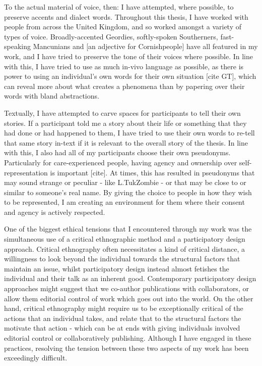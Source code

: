 To the actual material of voice, then: I have attempted, where possible, to preserve accents and dialect words. Throughout this thesis, I have worked with people from across the United Kingdom, and so worked amongst a variety of types of voice. Broadly-accented Geordies, softly-spoken Southerners, fast-speaking Mancunians and [an adjective for Cornishpeople] have all featured in my work, and I have tried to preserve the tone of their voices where possible. In line with this, I have tried to use as much in-vivo language as possible, as there is power to using an individual’s own words for their own situation [cite GT], which can reveal more about what creates a phenomena than by papering over their words with bland abstractions.   

Textually, I have attempted to carve spaces for participants to tell their own stories. If a participant told me a story about their life or something that they had done or had happened to them, I have tried to use their own words to re-tell that same story in-text if it is relevant to the overall story of the thesis. In line with this, I also had all of my participants choose their own pseudonyms. Particularly for care-experienced people, having agency and ownership over self-representation is important [cite]. At times, this has resulted in pseudonyms that may sound strange or peculiar - like L.TukZombie - or that may be close to or similar to someone’s real name. By giving the choice to people in how they wish to be represented, I am creating an environment for them where their consent and agency is actively respected.

One of the biggest ethical tensions that I encountered through my work was the simultaneous use of a critical ethnographic method and a participatory design approach. Critical ethnography often necessitates a kind of critical distance, a willingness to look beyond the individual towards the structural factors that maintain an issue, whilst participatory design instead almost fetishes the individual and their talk as an inherent good. Contemporary participatory design approaches might suggest that we co-author publications with collaborators, or allow them editorial control of work which goes out into the world. On the other hand, critical ethnography might require us to be exceptionally critical of the actions that an individual takes, and relate that to the structural factors the motivate that action - which can be at ends with giving individuals involved editorial control or collaboratively publishing. Although I have engaged in these practices, resolving the tension between these two aspects of my work has been exceedingly difficult.

